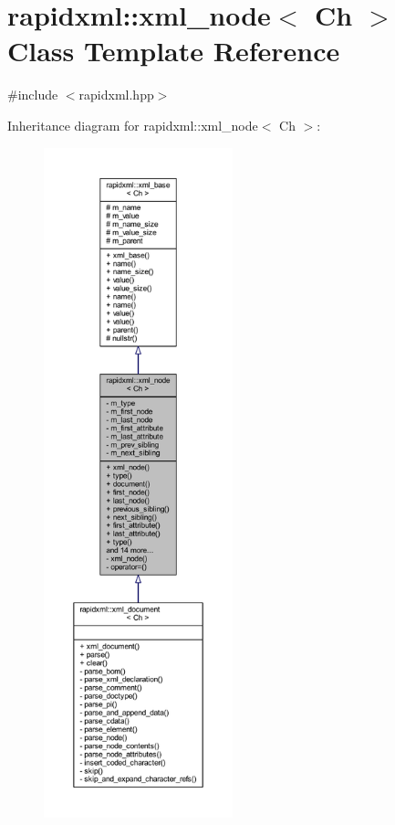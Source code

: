 \hypertarget{singletonrapidxml_1_1xml__node}{\section{rapidxml\+:\+:xml\+\_\+node$<$ Ch $>$ Class Template Reference}
\label{singletonrapidxml_1_1xml__node}
}


{\ttfamily \#include $<$rapidxml.\+hpp$>$}



Inheritance diagram for rapidxml\+:\+:xml\+\_\+node$<$ Ch $>$\+:\nopagebreak
\begin{figure}[H]
\begin{center}
\leavevmode
\includegraphics[height=550pt]{singletonrapidxml_1_1xml__node__inherit__graph}
\end{center}
\end{figure}


